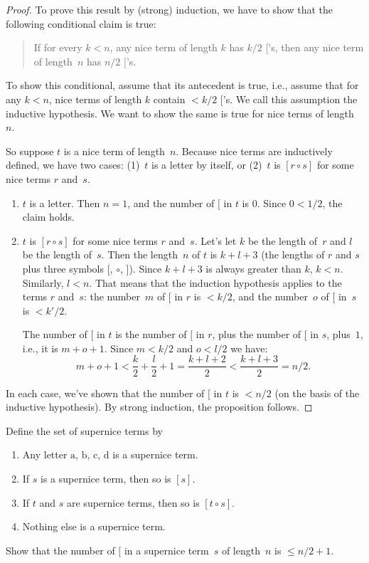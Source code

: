 \documentclass[../../../include/open-logic-section]{subfiles}
\begin{document}
\begin{proof}
To prove this result by (strong) induction, we have to show that the
following conditional claim is true:
\begin{quote}
  If for every $k < n$, any nice term of length $k$ has $k/2$
  $[$'s, then any nice term of length~$n$ has $n/2$ $[$'s.
\end{quote}
To show this conditional, assume that its antecedent is true, i.e.,
assume that for any $k<n$, nice terms of length $k$ contain $< k/2$
$[$'s.  We call this assumption the inductive hypothesis. We want to
show the same is true for nice terms of length~$n$.

So suppose $t$ is a nice term of length~$n$.  Because nice terms are
inductively defined, we have two cases: (1)~$t$ is a letter by
itself, or (2)~$t$ is $[r \circ s]$ for some nice terms $r$ and~$s$.
\begin{enumerate}
\item $t$ is a letter.  Then $n = 1$, and the number of $[$ in $t$ is
  $0$. Since $0 < 1/2$, the claim holds.
\item $t$ is $[r \circ s]$ for some nice terms $r$ and~$s$.  Let's
  let $k$ be the length of~$r$ and $l$ be the length of~$s$.  Then
  the length~$n$ of $t$ is $k+l+3$ (the lengths of $r$ and $s$ plus
  three symbols $[$, $\circ$, $]$). Since $k+l+3$ is always greater
  than $k$, $k < n$. Similarly, $l < n$. That means that the
  induction hypothesis applies to the terms $r$ and~$s$: the
  number~$m$ of $[$ in $r$ is $< k/2$, and the number~$o$ of $[$ in~$s$ is
  $< k'/2$.

  The number of $[$ in $t$ is the number of $[$ in $r$, plus the
  number of $[$ in $s$, plus~$1$, i.e., it is $m + o + 1$. Since $m
  < k/2$ and $o < l/2$ we have:
  \[
  m + o + 1 < \frac{k}{2} + \frac{l}{2} + 1 = \frac{k+l+2}{2} < \frac{k+l+3}{2} = n/2.
  \]
\end{enumerate}
In each case, we've shown that the number of $[$ in $t$ is $< n/2$ (on
the basis of the inductive hypothesis). By strong induction, the
proposition follows.
\end{proof}

\begin{prob}
  Define the set of supernice terms by
  \begin{enumerate}
  \item Any letter $\mathrm{a}$, $\mathrm{b}$, $\mathrm{c}$,
    $\mathrm{d}$ is a supernice term.
  \item If $s$ is a supernice term, then so is $[s]$.
  \item If $t$ and $s$ are supernice terms, then so
    is $[t \circ s]$.
  \item Nothing else is a supernice term.
  \end{enumerate}
  Show that the number of $[$ in a supernice term~$s$ of length~$n$ is
    $\le n/2 +1$.
\end{prob}
\end{document}
